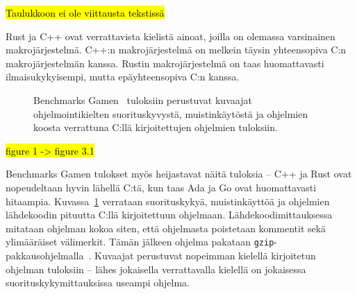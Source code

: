 \hl{Taulukkoon ei ole viittausta tekstissä}

Rust ja C++ ovat verrattavista kielistä ainoat, joilla on olemassa varsinainen
makrojärjestelmä. C++:n makrojärjestelmä on melkein täysin yhteensopiva C:n
makrojärjestelmän kanssa. Rustin makrojärjestelmä on taas huomattavasti
ilmaisukykyisempi, mutta epäyhteensopiva C:n kanssa.

\newpage

\begin{figure}[ht!]
    \begin{adjustbox}{center}
    \begin{minipage}{1.15\textwidth}
    \begin{minipage}{0.5\textwidth}
        
        \vspace*{-0.8cm}
    \end{minipage}
    \begin{minipage}{0.5\textwidth}
        
        \vspace*{-0.9cm}
    \end{minipage}
    \end{minipage}
    \end{adjustbox}
    \begin{adjustbox}{center}
    \begin{minipage}{1.15\textwidth}
    \end{minipage}
    \end{adjustbox}
    \caption{
        Benchmarks Gamen~\citep[tiedot haettu 10.1.2019]{benchmarks} tuloksiin
        perustuvat kuvaajat ohjelmointikielten suorituskyvystä, muistinkäytöstä
        ja ohjelmien koosta verrattuna C:llä kirjoitettujen ohjelmien
        tuloksiin.}
    \label{fig:benchmarksgame}
\end{figure}

\FloatBarrier

\hl{figure 1 -> figure 3.1}

Benchmarks Gamen tulokset myös heijastavat näitä tuloksia -- C++ ja Rust ovat
nopeudeltaan hyvin lähellä C:tä, kun taas Ada ja Go ovat huomattavasti
hitaampia. Kuvassa~\ref{fig:benchmarksgame} verrataan suorituskykyä,
muistinkäyttöä ja ohjelmien lähdekoodin pituutta C:llä kirjoitettuun ohjelmaan.
Lähdekoodimittauksessa mitataan ohjelman kokoa siten, että ohjelmasta
poistetaan kommentit sekä ylimääräiset välimerkit. Tämän jälkeen ohjelma
pakataan \texttt{gzip}-pakkausohjelmalla~\citep{howmeasured}. Kuvaajat
perustuvat nopeimman kielellä kirjoitetun ohjelman tuloksiin -- lähes
jokaisella verrattavalla kielellä on jokaisessa suorituskykymittauksissa
useampi ohjelma.

